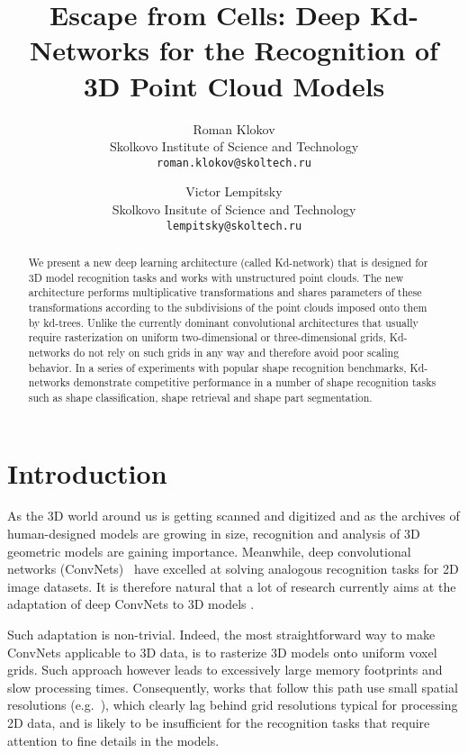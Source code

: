 \documentclass[10pt,twocolumn,letterpaper]{article}
\begin{document}
\title{Escape from Cells: Deep Kd-Networks for the Recognition of\\ 3D Point Cloud Models}

\author{Roman Klokov\\
Skolkovo Institute of Science and Technology\\
{\tt\small roman.klokov@skoltech.ru}
\and
Victor Lempitsky\\
Skolkovo Insitute of Science and Technology\\
{\tt\small lempitsky@skoltech.ru}
}

\maketitle
\thispagestyle{empty}
\begin{abstract}
We present a new deep learning architecture (called Kd-network) that is designed for 3D model recognition tasks and works with unstructured point clouds. The new architecture performs multiplicative transformations and shares parameters of these transformations according to the subdivisions of the point clouds imposed onto them by kd-trees. Unlike the currently dominant convolutional architectures that usually require rasterization on uniform two-dimensional or three-dimensional grids, Kd-networks do not rely on such grids in any way and therefore avoid poor scaling behavior. In a series of experiments with popular shape recognition benchmarks, Kd-networks demonstrate competitive performance in a number of shape recognition tasks such as shape classification, shape retrieval and shape part segmentation.
\end{abstract}

\section{Introduction}

As the 3D world around us is getting scanned and digitized and as the archives of human-designed models are growing in size, recognition and analysis of 3D geometric models are gaining importance. Meanwhile, deep convolutional networks (ConvNets)~\cite{LeCun98} have excelled at solving analogous recognition tasks for 2D image datasets. It is therefore natural that a lot of research currently aims at the adaptation of deep ConvNets to 3D models \cite{Wu15,Maturana15,Brock16, Wu16,Wang15,Qi16a,Su15,Boscaini15,Boscaini16}.

Such adaptation is non-trivial. Indeed, the most straightforward way to make ConvNets applicable to 3D data, is to rasterize 3D models onto uniform voxel grids. Such approach however leads to excessively large memory footprints and slow processing times. Consequently, works that follow this path \cite{Wu15, Maturana15,Brock16, Wu16,Wang15,Li16} use small spatial resolutions (e.g.\ ), which clearly lag behind grid resolutions typical for processing 2D data, and is likely to be insufficient for the recognition tasks that require attention to fine details in the models.
\end{document}
